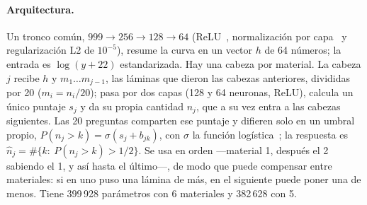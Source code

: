 \paragraph{Arquitectura.} Un tronco común, $999\to256\to128\to64$ (ReLU~\cite{relu}, normalización por capa~\cite{layernorm} y regularización L2 de $10^{-5}$), resume la curva en un vector $h$ de 64 números; la entrada es $\log(y+22)$ estandarizada. Hay una cabeza por material. La cabeza $j$ recibe $h$ y $m_1\ldots m_{j-1}$, las láminas que dieron las cabezas anteriores, divididas por 20 ($m_i=n_i/20$); pasa por dos capas (128 y 64 neuronas, ReLU), calcula un único puntaje $s_j$ y da su propia cantidad $n_j$, que a su vez entra a las cabezas siguientes. Las 20 preguntas comparten ese puntaje y difieren solo en un umbral propio, $P(n_j>k)=\sigma(s_j+b_{jk})$, con $\sigma$ la función logística~\cite{cao}; la respuesta es $\hat n_j=\#\{k:\ P(n_j>k)>1/2\}$. Se usa en orden ---material 1, después el 2 sabiendo el 1, y así hasta el último---, de modo que puede compensar entre materiales: si en uno puso una lámina de más, en el siguiente puede poner una de menos. Tiene 399\,928 parámetros con 6 materiales y 382\,628 con 5.

